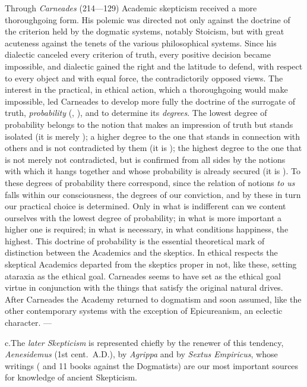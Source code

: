 Through \emph{Carneades} (214---129) Academic skepticism received a
more thoroughgoing form. His polemic was directed not only against the
doctrine of the criterion held by the dogmatic systems, notably
Stoicism, but with great acuteness against the tenets of the various
philosophical systems. Since his dialectic canceled every criterion of
truth, every positive decision became impossible, and dialectic gained
the right and the latitude to defend, with respect to every object and
with equal force, the contradictorily opposed views. The interest in the
practical, in ethical action, which a thoroughgoing  would make
impossible, led Carneades to develop more fully the doctrine
of the surrogate of truth, \emph{probability} (,
), and to determine its \emph{degrees}. The lowest degree of
probability belongs to the notion that makes an impression of truth but
stands isolated (it is merely ); a higher degree to the one
that stands in connection with others and is not contradicted by them
(it is ); the highest degree to the one that
is not merely not contradicted, but is confirmed from all sides by the
notions with which it hangs together and whose probability is already
secured (it is ). To these
degrees of probability there correspond, since the relation of notions
\emph{to us} falls within our consciousness, the degrees of our
conviction, and by these in turn our practical choice is determined.
Only in what is indifferent can we content ourselves with the lowest
degree of probability; in what is more important a higher one is
required; in what is necessary, in what conditions happiness, the
highest. This doctrine of probability is the essential theoretical mark
of distinction between the Academics and the skeptics. In ethical
respects the skeptical Academics departed from the skeptics proper in
not, like these, setting ataraxia as the ethical goal. Carneades seems
to have set as the ethical goal virtue in conjunction with the things
that satisfy the original natural drives. After Carneades the Academy
returned to dogmatism and soon assumed, like the other contemporary
systems with the exception of Epicureanism, an eclectic character. ---

\divrule

c.\enspace The \emph{later Skepticism} is represented chiefly by
the renewer of this tendency, \emph{Aenesidemus} (1st cent.\ A.D.),
by \emph{Agrippa} and by \emph{Sextus Empiricus}, whose writings
( and 11 books against the Dogmatists) are
our most important sources for knowledge of ancient Skepticism.

